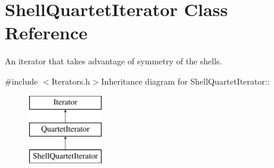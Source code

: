 \hypertarget{classJKBuilder_1_1ShellQuartetIterator}{
\section{ShellQuartetIterator Class Reference}
\label{classJKBuilder_1_1ShellQuartetIterator}
}


An iterator that takes advantage of symmetry of the shells.  


{\ttfamily \#include $<$Iterators.h$>$}Inheritance diagram for ShellQuartetIterator::\begin{figure}[H]
\begin{center}
\leavevmode
\includegraphics[height=3cm]{classJKBuilder_1_1ShellQuartetIterator}
\end{center}
\end{figure}
